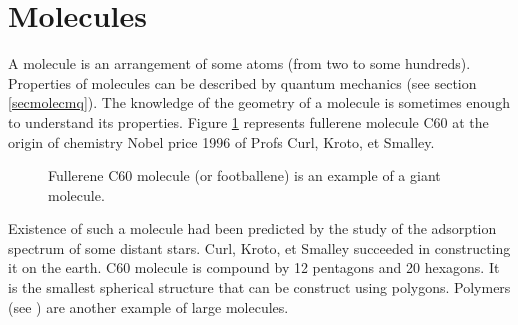 \documentclass[12pt]{book}
\begin{document}
\section{Molecules}
A molecule \cite{ph:mecaq:Cohen73,ph:mecaq:Pauling60} is an arrangement of some
atoms (from two to some hundreds). Properties of molecules
can be described by quantum mechanics (see section \ref{secmolecmq}). The
knowledge of the geometry of a molecule is sometimes enough to understand its
properties. Figure \ref{figc60fig} represents fullerene molecule C60 at the
origin of chemistry Nobel price 1996 of Profs Curl, Kroto, et Smalley.
\begin{figure}[htb]
 \centerline{}   
 \caption{Fullerene C60 molecule (or footballene) is an example of a giant molecule.} 
 \label{figc60fig}
\end{figure}
Existence of such a molecule had been predicted by the study of the adsorption
spectrum of some distant stars.
Curl, Kroto, et Smalley succeeded in constructing it on the earth.  C60
molecule is compound by 12 pentagons and 20 hexagons.
It is the smallest spherical structure that can be construct using
polygons.  Polymers (see \cite{ph:ploym:Doi96}) are another
example of large molecules.
\end{document}
